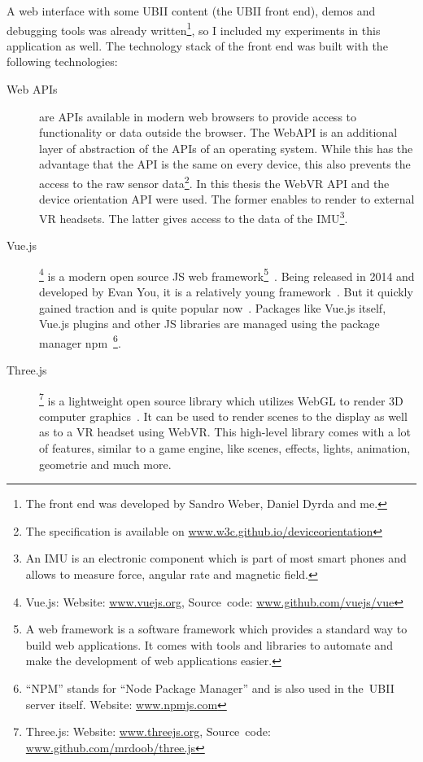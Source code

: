 A web interface with some \ac{UBII} content (the \ac{UBII} front end), demos and debugging tools was already written\footnote{The front end was developed by Sandro Weber, Daniel Dyrda and me.}, so I included my experiments in this application as well. The technology stack of the front end was built with the following technologies:
\begin{description}
  \item[Web APIs] are \acfp{API} available in modern web browsers to provide access to functionality or data outside the browser. The WebAPI is an additional layer of abstraction of the \acp{API} of an operating system. While this has the advantage that the API is the same on every device, this also prevents the access to the raw sensor data\footnote{The specification is available on \href{https://w3c.github.io/deviceorientation/}{www.w3c.github.io/deviceorientation}}. In this thesis the WebVR \ac{API} and the device orientation \ac{API} were used. The former enables to render to external \ac{VR} headsets. The latter gives access to the data of the \acf{IMU}\footnote{An IMU is an electronic component which is part of most smart phones and allows to measure force, angular rate and magnetic field.}.
  \item[Vue.js]\footnote{Vue.js: Website: \href{https://vuejs.org/}{www.vuejs.org}, Source~code: \href{https://github.com/vuejs/vue}{www.github.com/vuejs/vue}} is a modern open source \acl{JS} web framework\footnote{A web framework is a software framework which provides a standard way to build web applications. It comes with tools and libraries to automate and make the development of web applications easier.}~\cite{EvanYou.2019}. Being released in 2014 and developed by Evan You, it is a relatively young framework~\cite[17]{Koetsier.2016}. But it quickly gained traction and is quite popular now~\cite[12\psq]{Koetsier.2016}.
  Packages like Vue.js itself, Vue.js plugins and other \acl{JS} libraries are managed using the package manager npm~\footnote{\enquote{NPM} stands for \enquote{Node Package Manager} and is also used in the~\ac{UBII} server itself. Website: \href{https://www.npmjs.com/}{www.npmjs.com}}.
  \item[Three.js]\footnote{Three.js: Website: \href{https://threejs.org/}{www.threejs.org}, Source~code: \href{https://github.com/mrdoob/three.js/}{www.github.com/mrdoob/three.js}} is a lightweight open source library which utilizes WebGL to render \ac{3D} computer graphics~\cite{RicardoCabello.2019}. It can be used to render scenes to the display as well as to a VR headset using WebVR. This high-level library comes with a lot of features, similar to a game engine, like scenes, effects, lights, animation, geometrie and much more.

\end{description}
